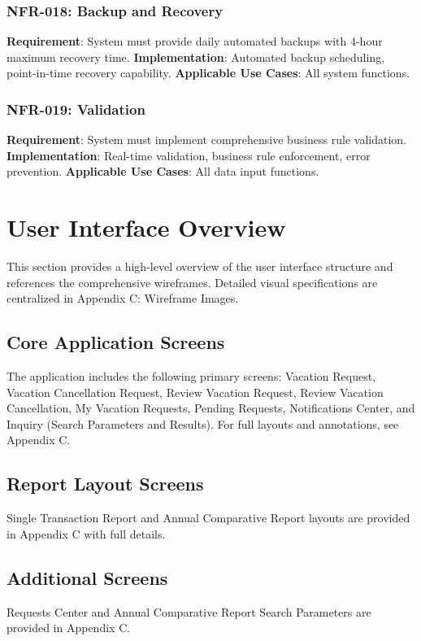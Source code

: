 \documentclass[12pt,a4paper]{article}
\begin{document}
\subsubsection{NFR-018: Backup and Recovery}
\textbf{Requirement}: System must provide daily automated backups with 4-hour maximum recovery time.
\textbf{Implementation}: Automated backup scheduling, point-in-time recovery capability.
\textbf{Applicable Use Cases}: All system functions.

\subsubsection{NFR-019: Validation}
\textbf{Requirement}: System must implement comprehensive business rule validation.
\textbf{Implementation}: Real-time validation, business rule enforcement, error prevention.
\textbf{Applicable Use Cases}: All data input functions.

\section{User Interface Overview}

This section provides a high-level overview of the user interface structure and references the comprehensive wireframes. Detailed visual specifications are centralized in Appendix C: Wireframe Images.

\subsection{Core Application Screens}
The application includes the following primary screens: Vacation Request, Vacation Cancellation Request, Review Vacation Request, Review Vacation Cancellation, My Vacation Requests, Pending Requests, Notifications Center, and Inquiry (Search Parameters and Results). For full layouts and annotations, see Appendix C.

\subsection{Report Layout Screens}
Single Transaction Report and Annual Comparative Report layouts are provided in Appendix C with full details.

\subsection{Additional Screens}
Requests Center and Annual Comparative Report Search Parameters are provided in Appendix C.
\end{document}
